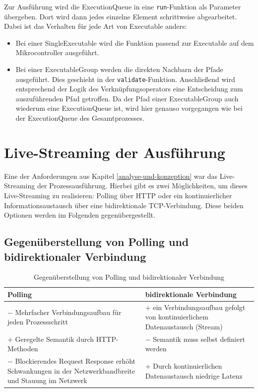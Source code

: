 \noindent Zur Ausführung wird die ExecutionQueue in eine \texttt{run}-Funktion als Parameter übergeben. Dort wird dann jedes einzelne Element schrittweise abgearbeitet. Dabei ist das Verhalten für jede Art von Executable anders:

\begin{itemize}
\item Bei einer SingleExecutable wird die Funktion passend zur Executable auf dem Mikrocontroller ausgeführt.

\item Bei einer ExecutableGroup 
werden die direkten Nachbarn der Pfade ausgeführt. Dies geschieht in der \texttt{validate}-Funktion. Anschließend wird entsprechend der Logik des Verknüpfungsoperators eine Entscheidung zum auszuführenden Pfad getroffen. Da der Pfad einer ExecutableGroup auch wiederum eine ExecutionQueue ist, wird hier genauso vorgegangen wie bei der ExecutionQueue des Gesamtprozesses. 
\end{itemize}



\section{Live-Streaming der Ausführung}
\label{automation-animation}

Eine der Anforderungen aus Kapitel \ref{analyse-und-konzeption} war das Live-Streaming der Prozessausführung. Hierbei gibt es zwei Möglichkeiten, um dieses
Live-Streaming zu realisieren: Polling über \ac{HTTP} oder ein kontinuierlicher Informationsaustausch über eine bidirektionale TCP-Verbindung. Diese beiden Optionen werden
im Folgenden gegenübergestellt.

\subsection{Gegenüberstellung von Polling und bidirektionaler Verbindung}

\begin{table}[H]
\centering
\begin{tabularx}{\textwidth}{>{\raggedright\arraybackslash}X >{\raggedright\arraybackslash}X}
\toprule
Polling & bidirektionale Verbindung \\
\midrule
$-$ Mehrfacher Verbindungsaufbau für jeden Prozessschritt \cite{obonguko_websockets_2025}  & $+$ ein Verbindungsaufbau gefolgt von kontinuierlichem Datenaustausch (Stream) \cite{eddy_transmission_2022} \\
\addlinespace
$+$ Geregelte Semantik durch HTTP-Methoden \cite{fielding_http_2022} & $-$ Semantik muss selbst definiert werden \cite{eddy_transmission_2022} \\
\addlinespace
$-$ Blockierendes Request Response erhöht Schwankungen in der Netzwerkbandbreite und Stauung im Netzwerk \cite{obonguko_websockets_2025} & $+$ Durch kontinuierlichen Datenaustausch niedrige Latenz \cite{loreto_known_2011} \\
\bottomrule                         
\end{tabularx}
\caption{Gegenüberstellung von Polling und bidirektionaler Verbindung}
\label{tab:polling-vs-birectional}
\end{table}

